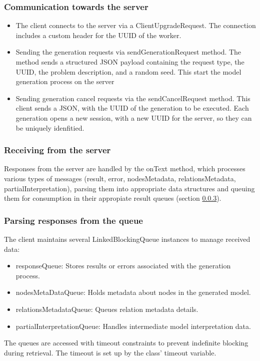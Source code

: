 			\subsubsection{Communication towards the server} 
				\begin{itemize}
					\item The client connects to the server via a ClientUpgradeRequest. The connection includes a custom header for the UUID of the worker.
					\item Sending the generation requests via sendGenerationRequest method. The method sends a structured JSON payload containing the request type,
					the UUID, the problem description, and a random seed. This start the model generation process on the server
					\item \label{clientcancel}Sending generation cancel requests via the sendCancelRequest method. This client sends a JSON, with the UUID of the generation to be 
					executed. Each generation opens a new session, with a new UUID for the server, so they can be uniquely idenfitied.
				\end{itemize} 
			\subsubsection{Receiving from the server} 
				Responses from the server are handled by the onText method, which processes various types of messages 
				(result, error, nodesMetadata, relationsMetadata, partialInterpretation), parsing them into appropriate data 
				structures and queuing them for consumption in their appropiate result queues (section \ref{resultqueues}).

			\subsubsection{Parsing responses from the queue} \label{resultqueues}
				The client maintains several LinkedBlockingQueue instances to manage received data:
				\begin{itemize}
					\item responseQueue: Stores results or errors associated with the generation process.
					\item nodesMetaDataQueue: Holds metadata about nodes in the generated model.
					\item relationsMetadataQueue: Queues relation metadata details.
					\item partialInterpretationQueue: Handles intermediate model interpretation data.
				\end{itemize} 
				The queues are accessed with timeout constraints to prevent indefinite blocking during retrieval. The timeout is set up by the class'
				timeout variable. 
				
